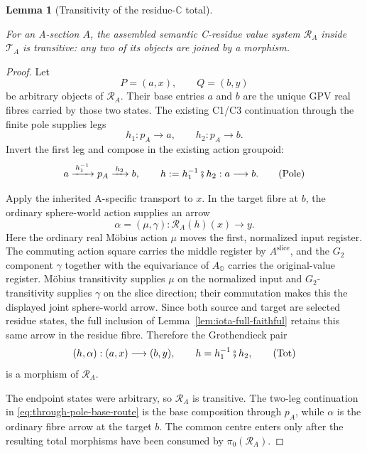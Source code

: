 \documentclass[11pt]{article}
\newcommand{\OO}{\mathbb{O}}
\newcommand{\CC}{\mathbb{C}}
\providecommand{\notready}{}
\providecommand{\uses}[1]{}
\theoremstyle{plain}
\newtheorem{lemma}[theorem]{Lemma}
\theoremstyle{definition}
\theoremstyle{remark}
\begin{document}
\begin{lemma}[Transitivity of the residue-$\CC$ total]\label{lem:c-residue-transitive}
\notready
\uses{def:A-section, def:base, def:residue-subdiagram, prop:weierstrass,
def:cayley-disk, prop:aslice-functor, lem:residue-spheres, thm:G2-S6}
For an A-section $A$, the assembled semantic C-residue value system
$\mathcal R_A$ inside $\mathcal T_A$ is transitive: any two of its objects
are joined by a morphism.
\end{lemma}
\begin{proof}
Let
\[
 P=(a,x),\qquad Q=(b,y)
\]
be arbitrary objects of $\mathcal R_A$. Their base entries $a$ and $b$ are
the unique GPV real fibres carried by those two states. The existing C1/C3
continuation through the finite pole supplies legs
\[
 h_1:p_A\longrightarrow a,\qquad h_2:p_A\longrightarrow b.
\]
Invert the first leg and compose in the existing action groupoid:
\[
 a\xrightarrow{\,h_1^{-1}\,}p_A
   \xrightarrow{\,h_2\,}b,
 \qquad h:=h_1^{-1}\fatsemi h_2:a\longrightarrow b.
                                                        \tag{Pole}\label{eq:through-pole-base-route}
\]

Apply the inherited A-specific transport to $x$. In the target fibre at
$b$, the ordinary sphere-world action supplies an arrow
\[
 \alpha=(\mu,\gamma):\mathcal R_A(h)(x)\longrightarrow y.
\]
Here the ordinary real M\"obius action $\mu$ moves the first, normalized
input register. The commuting action square carries the middle register by
$A^{\mathrm{slice}}$, and the $G_2$ component $\gamma$ together with the
equivariance of $A_{\OO}$ carries the original-value register. M\"obius
transitivity supplies $\mu$ on the normalized input and $G_2$-transitivity
supplies $\gamma$ on the slice direction; their commutation makes this the
displayed joint sphere-world arrow. Since both source and target are selected
residue states, the full inclusion of Lemma~\ref{lem:iota-full-faithful}
retains this same arrow in the residue fibre. Therefore the Grothendieck pair
\[
 (h,\alpha):(a,x)\longrightarrow(b,y),
 \qquad h=h_1^{-1}\fatsemi h_2,
                                                        \tag{Tot}\label{eq:through-pole-total-route}
\]
is a morphism of $\mathcal R_A$.

The endpoint states were arbitrary, so $\mathcal R_A$ is transitive. The
two-leg continuation in \eqref{eq:through-pole-base-route} is the base
composition through $p_A$, while $\alpha$ is the ordinary fibre arrow at the
target $b$. The common centre enters only after the resulting total morphisms
have been consumed by $\pi_0(\mathcal R_A)$.
\end{proof}
\end{document}
